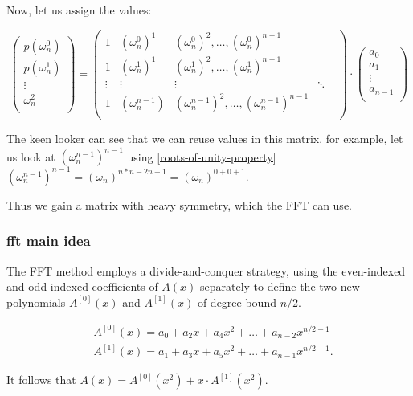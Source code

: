  Now, let us assign the values:

 \label{dft-matrix}
 $$
\begin{pmatrix}
  p(\omega_n^0)\\
  p(\omega_n^1)\\
  \vdots \\
  \omega_n^2\\
\end{pmatrix}
=
\begin{pmatrix}
  1 & (\omega_n^0)^1 & (\omega_n^0)^2 ,\dots ,(\omega_n^0)^{n-1}\\
  1 & (\omega_n^1)^1 & (\omega_n^1)^2, \dots, (\omega_n^1)^{n-1}\\
  \vdots & \vdots & \vdots & \ddots & \\
  1 & (\omega_n^{n-1}) & (\omega_n^{n-1})^2, \dots,(\omega_n^{n-1})^{n-1}\\
 \end{pmatrix}
 \cdot 
\begin{pmatrix}
  a_0\\
  a_1\\
  \vdots \\
  a_{n-1}\\
\end{pmatrix}
 $$

 The keen looker can see that we can reuse values in this matrix.
 for example, let us look at $(\omega_n^{n-1})^{n-1}$ using \ref{roots-of-unity-property}
 $(\omega_n^{n-1})^{n-1} = (\omega_n)^{n*n-2n+1}=(\omega_n)^{0+0+1}$.  

 Thus we gain a matrix with heavy symmetry, which the FFT can use.



\subsubsection*{fft main idea}
The FFT method employs a divide-and-conquer strategy, 
using the even-indexed and odd-indexed coefficients of $A(x)$
separately to define the two new polynomials $A^{[0]}(x)$ and $A^{[1]}(x)$ of degree-bound $n/2$.

\begin{align}
  &A^{[0]}(x) =  a_0 +a_2x + a_4x^2 + \dots + a_{n-2}x^{n/2-1}\\
  &A^{[1]}(x) =  a_1 +a_3x + a_5x^2 + \dots + a_{n-1}x^{n/2-1}.
\end{align}


It follows that $A(x)=A^{[0]}(x^2) + x\cdot A^{[1]}(x^2)$.

